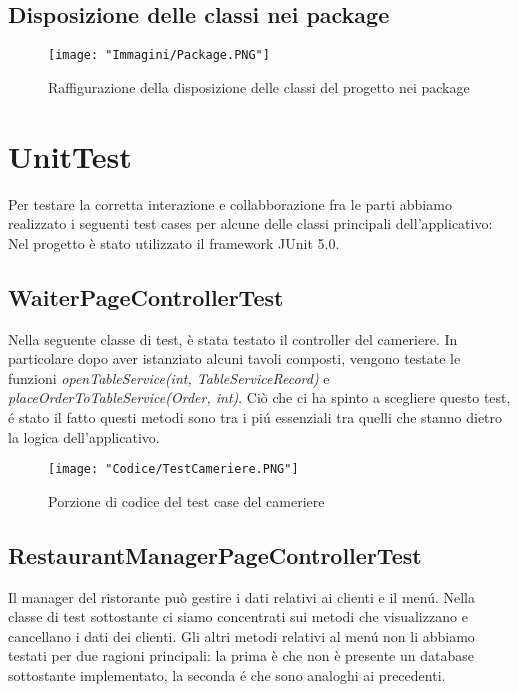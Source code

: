 \documentclass{article}
\begin{document}
\subsection{Disposizione delle classi nei package} 

\begin{figure}[!h]
\centering
\texttt{[image: "Immagini/Package.PNG"]}
\caption{Raffigurazione della disposizione delle classi del progetto nei package}
\end{figure}

\newpage

\section{UnitTest}
Per testare la corretta interazione e collabborazione fra le parti abbiamo realizzato i seguenti test cases per alcune delle classi principali dell’applicativo: \\
\newline
Nel progetto è stato utilizzato il framework JUnit 5.0.

\subsection{WaiterPageControllerTest}

Nella seguente classe di test, è stata testato il controller del cameriere. In particolare dopo aver istanziato alcuni tavoli composti, vengono testate le funzioni \textit{openTableService(int, TableServiceRecord)} e \textit{placeOrderToTableService(Order, int)}. Ciò che ci ha spinto a scegliere questo test, \'e stato il fatto questi metodi sono tra i pi\'u essenziali tra quelli che stanno dietro la logica dell’applicativo.

\begin{figure}[!h]
\centering
\texttt{[image: "Codice/TestCameriere.PNG"]}
\caption{Porzione di codice del test case del cameriere}
\end{figure}

\newpage

\subsection{RestaurantManagerPageControllerTest}

Il manager del ristorante può gestire i dati relativi ai clienti e il men\'u. Nella classe di test sottostante ci siamo concentrati sui metodi che visualizzano e cancellano i dati dei clienti. Gli altri metodi relativi al men\'u non li abbiamo testati per due ragioni principali: la prima è che non è presente un database sottostante implementato, la seconda \'e che sono analoghi ai precedenti.
\end{document}
